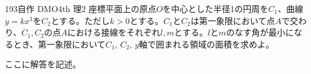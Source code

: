 \begin{thm}{193}{\maru}{自作 DMO4th 理2}
 座標平面上の原点$O$を中心とした半径1の円周を$C_1$、曲線$y=kx^3$を$C_2$とする。ただし$k>0$とする。$C_1$と$C_2$は第一象限において点$A$で交わり、$C_1, C_2$の点$A$における接線をそれぞれ$l, m$とする。$l$と$m$のなす角が最小になるとき、第一象限において$C_1$, $C_2$, $y$軸で囲まれる領域の面積を求めよ。
\end{thm}

ここに解答を記述。